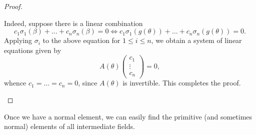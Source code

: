 \begin{proof}
\begin{description}
    Indeed, suppose there is a linear combination 
    \begin{equation*}
        c_1\sigma_1(\beta) + \dots + c_n\sigma_n(\beta) = 0\iff c_1\sigma_1(g(\theta)) + \dots + c_n\sigma_n(g(\theta)) = 0.
    \end{equation*}
    Applying $\sigma_i$ to the above equation for $1\le i\le n$, we obtain a system of linear equations given by 
    \begin{equation*}
        A(\theta)
        \begin{pmatrix}
            c_1\\\vdots\\c_n
        \end{pmatrix}
        = 0,
    \end{equation*}
    whence $c_1 = \dots = c_n = 0$, since $A(\theta)$ is invertible. This completes the proof.\qedhere
\end{description}
\end{proof}

Once we have a normal element, we can easily find the primitive (and sometimes normal) elements of all intermediate fields.

